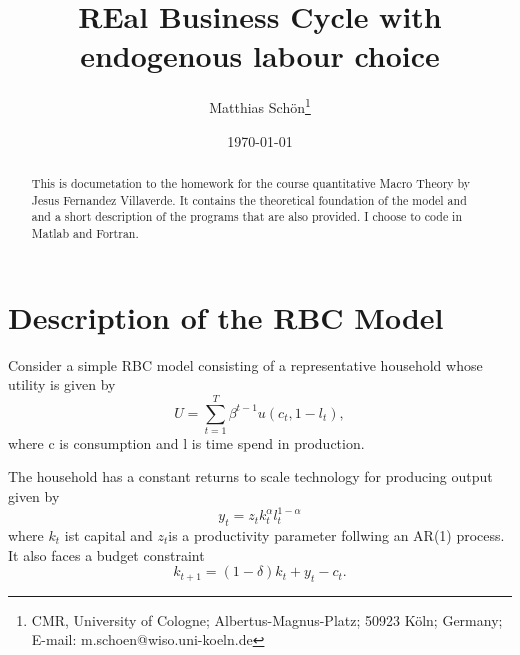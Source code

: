 \documentclass[a4paper,12pt]{article}
\begin{document}
\title{REal Business Cycle with endogenous labour choice}
\author{Matthias Sch\"{o}n\thanks{%
CMR, University of Cologne; Albertus-Magnus-Platz; 50923 K\"{o}ln; Germany;
E-mail: m.schoen@wiso.uni-koeln.de}}
\date{\today }
\maketitle

\begin{abstract}
This is documetation to the homework for the course quantitative Macro
Theory by Jesus Fernandez Villaverde. It contains the theoretical foundation
of the model and and a short description of the programs that are also
provided. I choose to code in Matlab and Fortran.
\end{abstract}

\newpage {} \renewcommand{\thefootnote}{%
\arabic{footnote}} \setcounter{footnote}{0}

\section*{Description of the RBC Model}

Consider a simple RBC model consisting of a representative household whose
utility is given by 
\begin{equation*}
U=\sum_{t=1}^{T}\beta ^{t-1}u\left( c_{t},1-l_{t}\right) ,
\end{equation*}%
where c is consumption and l is time spend in production. 

The household has a constant returns to scale technology for producing
output given by 
\begin{equation*}
y_{t}=z_{t}k_{t}^{\alpha }l_{t}^{1-\alpha }
\end{equation*}
where $k_{t}$ ist capital and $z_{t}$is a productivity parameter follwing an
AR(1) process. It also faces a budget constraint 
\begin{equation*}
k_{t+1}=\left( 1-\delta \right) k_{t}+y_{t}-c_{t}.
\end{equation*}
\end{document}

